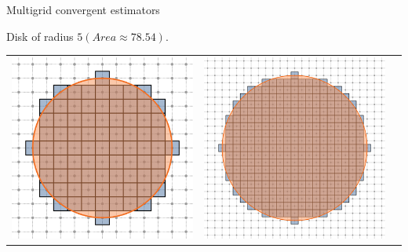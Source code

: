 \begin{frame}
{Multigrid convergent estimators}

\footnotesize

\center
Disk of radius $5 (Area\approx78.54).$ 

\center
\begin{tabular}{ccc}
\includegraphics[scale=0.4]{figures/digital-estimators/multigrid/h1.png} &
\includegraphics[scale=0.4]{figures/digital-estimators/multigrid/h05.png} &

\end{tabular}
\end{frame}
